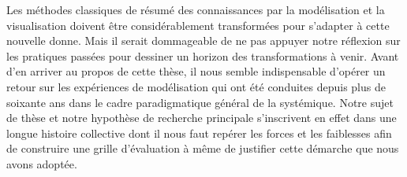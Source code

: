 Les méthodes classiques de résumé des connaissances par la modélisation et la visualisation doivent être considérablement transformées pour s’adapter à cette nouvelle donne. Mais il serait dommageable de ne pas appuyer notre réflexion sur les pratiques passées pour dessiner un horizon des transformations à venir. Avant d’en arriver au propos de cette thèse, il nous semble indispensable d’opérer un retour sur les expériences de modélisation qui ont été conduites depuis plus de soixante ans dans le cadre paradigmatique général de la systémique. Notre sujet de thèse et notre hypothèse de recherche principale s’inscrivent en effet dans une longue histoire collective dont il nous faut repérer les forces et les faiblesses afin de construire une grille d'évaluation à même de justifier cette démarche que nous avons adoptée.





\printbibliography[heading=subbibliography]

\stopcontents[chapters]